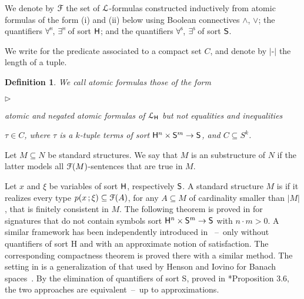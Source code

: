 \documentclass{amsproc}
\newcommand{\mylabel}[1]{{#1}\hfill}
\renewenvironment{itemize}
  {\begin{list}{$\triangleright$}{%
  \setlength{\parskip}{0mm}
  \setlength{\topsep}{.1\baselineskip}
  \setlength{\rightmargin}{0mm}
  \setlength{\listparindent}{0mm}
  \setlength{\itemindent}{0mm}
  \setlength{\labelwidth}{3ex}
  \setlength{\itemsep}{.1\baselineskip}
  \setlength{\parsep}{.1\baselineskip}
  \setlength{\partopsep}{0mm}
  \setlength{\labelsep}{1ex}
  \setlength{\leftmargin}{\labelwidth+\labelsep}
  \let\makelabel\mylabel}}{%
\end{list}}
\newcounter{thm}
\theoremstyle{mio}
\newtheorem{definition}[thm]{Definition}\tcolorboxenvironment{definition}{mythm}
\newtheorem{remark}[thm]{Remark}\tcolorboxenvironment{remark}{mythm}
\renewcommand*{\emph}[1]{%
   \smash{\tikz[baseline]\node[rectangle, fill=teal!25, rounded corners, inner xsep=0.5ex, inner ysep=0.2ex, anchor=base, minimum height = 2.7ex]{\strut #1};}}
\begin{document}
We denote by ${\EuScript F}$ the set of ${\EuScript L}$-formulas constructed inductively from atomic formulas of the form (i) and (ii) below using Boolean connectives $\wedge$, $\vee$; the quantifiers $\forall\raisebox{1.1ex}{\scaleto{\sf H}{.8ex}\kern-.2ex}$, $\exists\raisebox{1.1ex}{\scaleto{\sf H}{.8ex}\kern-.2ex}$ of sort ${\sf H}$; and the quantifiers $\forall\raisebox{1.1ex}{\scaleto{\sf S}{.8ex}\kern-.2ex}$, $\exists\raisebox{1.1ex}{\scaleto{\sf S}{.8ex}\kern-.2ex}$ of sort ${\sf S}$.

We write \emph{$x\in C$\/} for the predicate associated to a compact set $C$, and denote by $|\mbox{-}|$ the length of a tuple.

\begin{definition}
  We call atomic formulas those of the form
  \begin{itemize}
  \item[i.] atomic and negated atomic formulas of ${\EuScript L}_{\sf H}$ but not equalities and inequalities
  \item[ii.] $\tau\in C$, where $\tau$ is a $k$-tuple terms of sort ${\sf H}^n\times {\sf S}^m\to {\sf S}$, and $C\subseteq S^k$.
  \end{itemize}
\end{definition}


 Let $M\subseteq N$ be standard structures.
 We say that $M$ is an \emph{${\EuScript F}$-elementary\/} substructure of $N$ if the latter models all ${\EuScript F}(M)$-sentences that are true in $M$.

 Let $x$ and $\xi$ be variables of sort ${\sf H}$, respectively ${\sf S}$.
 A standard structure $M$ is \emph{${\EuScript F}$-saturated\/} if it realizes every type $p(x\,;\xi)\subseteq{\EuScript F}(A)$, for any $A\subseteq M$ of cardinality smaller than $|M|$, that is finitely consistent in $M$.
 The following theorem is proved in \cite{clcl} for signatures that do not contain symbols sort ${\sf H}^n\times{\sf S}^m\to {\sf S}$ with $n{\cdot}m>0$.
 A similar framework has been independently introduced in \cite{PC}~--~only without quantifiers of sort {\sf H} and with an approximate notion of satisfaction.
 The corresponding compactness theorem is proved there with a similar method.
 The setting in \cite{PC} is a generalization of that used by Henson and Iovino for Banach spaces~\cite{HI}.
 By the elimination of quantifiers of sort {\sf S}, proved in \cite{clcl}*{Proposition 3.6}, the two approaches are equivalent~--~up to approximations.
\end{document}

